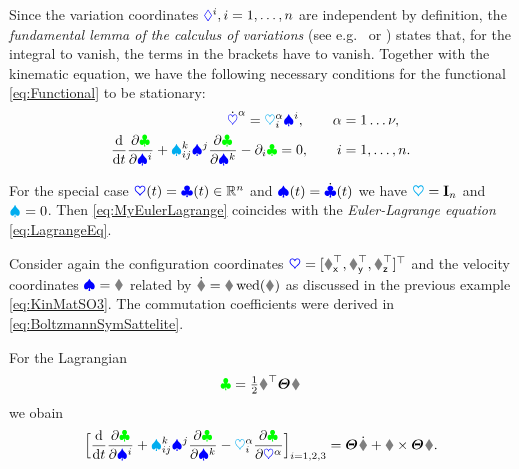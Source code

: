 Since the variation coordinates $\varCoordCoeff{\LidxI}, i=1,\ldots,\dimConfigSpace$ are independent by definition, the \textit{fundamental lemma of the calculus of variations} (see e.g.\ \cite[p.\,166]{CourantHilbert1} or \cite[p.\,57]{Arnold:MathematicalMethodsOfClassicalMechanics}) states that, for the integral to vanish, the terms in the brackets have to vanish.
Together with the kinematic equation, we have the following necessary conditions for the functional \eqref{eq:Functional} to be stationary:
\begin{subequations}\label{eq:MyEulerLagrange}
\begin{align}
 \sysCoordCoeffd{\GidxI} = \kinMatCoeff{\GidxI}{\LidxI} \sysVelCoeff{\LidxI}, \qquad
 \GidxI &= 1\ldots\numCoord,
\\
 \diff{t} \pdiff[\Lagrangian]{\sysVelCoeff{\LidxI}} + \BoltzSym{\LidxIII}{\LidxI}{\LidxII} \sysVelCoeff{\LidxII} \pdiff[\Lagrangian]{\sysVelCoeff{\LidxIII}} - \dirDiff{\LidxI}\Lagrangian = 0, \qquad
 \LidxI &= 1,\ldots,\dimConfigSpace.
\end{align}
\end{subequations}

For the special case $\sysCoord(t)=\genCoord(t)\in\RealNum^\dimConfigSpace$ and $\sysVel(t)=\genCoordd(t)$ we have $\kinMat=\idMat[\dimConfigSpace]$ and $\BoltzSym{}{}{}=0$.
Then \eqref{eq:MyEulerLagrange} coincides with the \textit{Euler-Lagrange equation} \eqref{eq:LagrangeEq}.

\begin{Example}
Consider again the configuration coordinates $\sysCoord = [\Rx^\top, \Ry^\top, \Rz^\top]^\top$ and the velocity coordinates $\sysVel = \w$ related by $\Rd = \R \wedOp(\w)$ as discussed in the previous example \eqref{eq:KinMatSO3}.
The commutation coefficients were derived in \eqref{eq:BoltzmannSymSattelite}.

For the Lagrangian 
\begin{align}
\Lagrangian = \tfrac{1}{2} \w^\top \bodyMOI{}{} \w 
\end{align}
we obain
\begin{align}
 \Big[ \diff{t} \pdiff[\Lagrangian]{\sysVelCoeff{\LidxI}} + \BoltzSym{\LidxIII}{\LidxI}{\LidxII} \sysVelCoeff{\LidxII} \pdiff[\Lagrangian]{\sysVelCoeff{\LidxIII}} - \kinMatCoeff{\GidxI}{\LidxI} \pdiff[\Lagrangian]{\sysCoordCoeff{\GidxI}} \Big]_{\LidxI=1,2,3}
 = \bodyMOI{}{} \wdot + \w \times \bodyMOI{}{} \w
 .
\end{align}
\end{Example}


